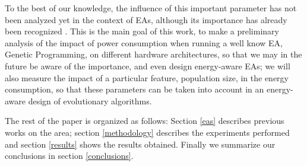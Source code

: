 To the best of our knowledge, the influence of this important
parameter has not been analyzed yet in the context of EAs, although
its importance has already been recognized \cite{ephemeral2015}.  This is
the main goal of this work, to make a preliminary analysis of the
impact of power consumption when running a well know EA, Genetic
Programming, on different hardware architectures, so that we may in
the future be aware of the 
importance, and even design energy-aware EAs; we will also measure the
impact of a particular feature, population size, in the energy
consumption, so that these parameters can be taken into account in an
energy-aware design of evolutionary algorithms. 

The rest of the paper is organized as follows:  Section \ref{eas}
describes previous works on the area;  section \ref{methodology}
describes the experiments performed and section \ref{results} shows
the results obtained.  Finally we summarize our conclusions in section
\ref{conclusions}. 


